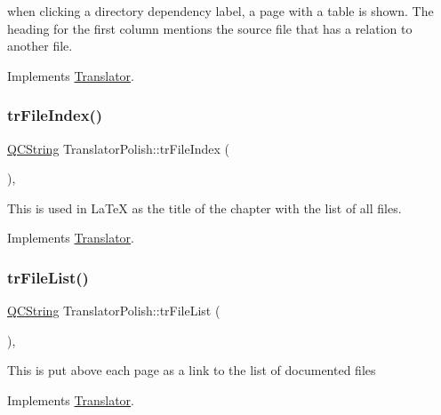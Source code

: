 when clicking a directory dependency label, a page with a table is shown. The heading for the first column mentions the source file that has a relation to another file. 

Implements \mbox{\hyperlink{class_translator}{Translator}}.

\mbox{\label{class_translator_polish_a2cd2082e04d120d38eef506d576e930a}} 
\subsubsection{\texorpdfstring{trFileIndex()}{trFileIndex()}}
{\footnotesize\ttfamily \mbox{\hyperlink{class_q_c_string}{Q\+C\+String}} Translator\+Polish\+::tr\+File\+Index (\begin{DoxyParamCaption}{ }\end{DoxyParamCaption})\hspace{0.3cm}{\ttfamily [inline]}, {\ttfamily [virtual]}}

This is used in La\+TeX as the title of the chapter with the list of all files. 

Implements \mbox{\hyperlink{class_translator}{Translator}}.

\mbox{\label{class_translator_polish_a338ca2e1ddddafaa41338ca875bee281}} 
\subsubsection{\texorpdfstring{trFileList()}{trFileList()}}
{\footnotesize\ttfamily \mbox{\hyperlink{class_q_c_string}{Q\+C\+String}} Translator\+Polish\+::tr\+File\+List (\begin{DoxyParamCaption}{ }\end{DoxyParamCaption})\hspace{0.3cm}{\ttfamily [inline]}, {\ttfamily [virtual]}}

This is put above each page as a link to the list of documented files 

Implements \mbox{\hyperlink{class_translator}{Translator}}.

\mbox{\label{class_translator_polish_af5c5cd0b0e21fdd312b99ef67b923585}} 
